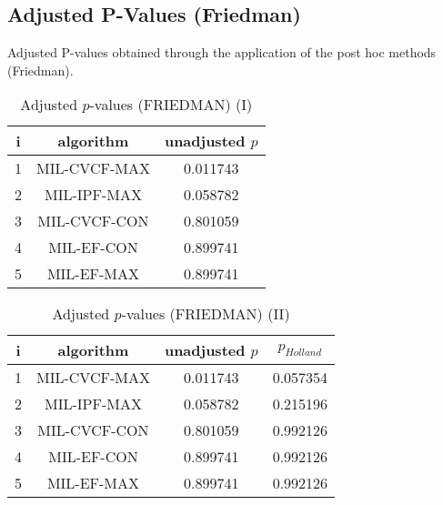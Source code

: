\documentclass[a4paper,10pt]{article}
\begin{document}
\begin{landscape}
\newpage

\section{Adjusted P-Values (Friedman)}


Adjusted P-values obtained through the application of the post hoc methods (Friedman).

\begin{table}[!htp]
\centering\small
\begin{tabular}{ccc}
i&algorithm&unadjusted $p$\\
\hline1&MIL-CVCF-MAX&0.011743\\2&MIL-IPF-MAX&0.058782\\3&MIL-CVCF-CON&0.801059\\4&MIL-EF-CON&0.899741\\5&MIL-EF-MAX&0.899741\\\hline
\end{tabular}
\caption{Adjusted $p$-values (FRIEDMAN) (I)}
\end{table}
\begin{table}[!htp]
\centering\small
\begin{tabular}{cccc}
i&algorithm&unadjusted $p$&$p_{Holland}$\\
\hline1&MIL-CVCF-MAX&0.011743&0.057354\\2&MIL-IPF-MAX&0.058782&0.215196\\3&MIL-CVCF-CON&0.801059&0.992126\\4&MIL-EF-CON&0.899741&0.992126\\5&MIL-EF-MAX&0.899741&0.992126\\\hline
\end{tabular}
\caption{Adjusted $p$-values (FRIEDMAN) (II)}
\end{table}

\newpage
\end{landscape}
\end{document}
